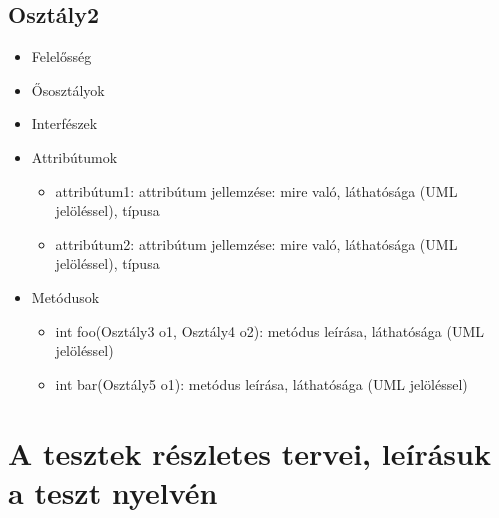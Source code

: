 \subsection{Osztály2}
\begin{itemize}
\item Felelősség\\
\item Ősosztályok\\
\item Interfészek\\
\item Attribútumok\\
	\begin{itemize}
		\item attribútum1: attribútum jellemzése: mire való, láthatósága (UML jelöléssel), típusa
		\item attribútum2: attribútum jellemzése: mire való, láthatósága (UML jelöléssel), típusa
	\end{itemize}
\item Metódusok\\
	\begin{itemize}
		\item int foo(Osztály3 o1, Osztály4 o2): metódus leírása, láthatósága (UML jelöléssel)
		\item int bar(Osztály5 o1): metódus leírása, láthatósága (UML jelöléssel)
	\end{itemize}
\end{itemize}

\section{A tesztek részletes tervei, leírásuk a teszt nyelvén}

